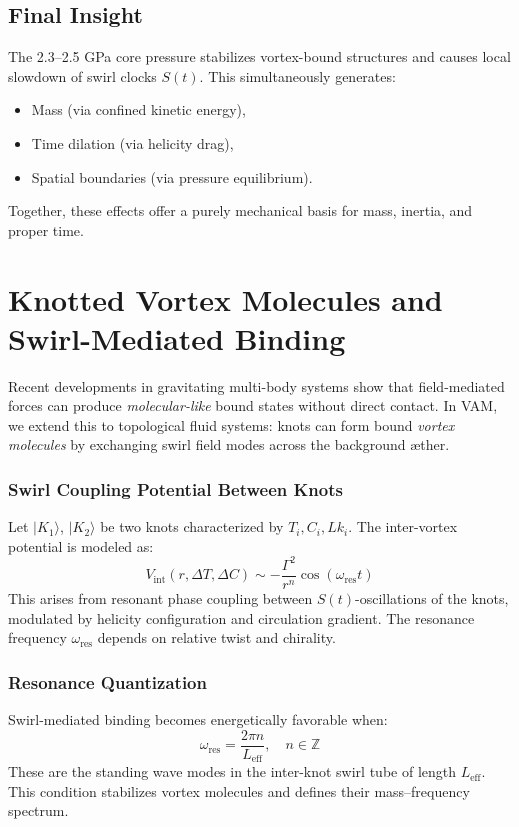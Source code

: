 \subsection*{Final Insight}

The 2.3–2.5 GPa core pressure stabilizes vortex-bound structures and causes local slowdown of swirl clocks \( S(t) \). This simultaneously generates:
\begin{itemize}
  \item Mass (via confined kinetic energy),
  \item Time dilation (via helicity drag),
  \item Spatial boundaries (via pressure equilibrium).
\end{itemize}
Together, these effects offer a purely mechanical basis for mass, inertia, and proper time.

\section{Knotted Vortex Molecules and Swirl-Mediated Binding}

Recent developments in gravitating multi-body systems show that field-mediated forces can produce \emph{molecular-like} bound states without direct contact. In VAM, we extend this to topological fluid systems: knots can form bound \textit{vortex molecules} by exchanging swirl field modes across the background æther.

\subsubsection*{Swirl Coupling Potential Between Knots}

Let \( |K_1\rangle \), \( |K_2\rangle \) be two knots characterized by \( T_i, C_i, Lk_i \). The inter-vortex potential is modeled as:
\[
V_{\text{int}}(r, \Delta T, \Delta C) \sim -\frac{\Gamma^2}{r^n} \cos(\omega_{\text{res}} t)
\]
This arises from resonant phase coupling between \( S(t) \)-oscillations of the knots, modulated by helicity configuration and circulation gradient. The resonance frequency \( \omega_{\text{res}} \) depends on relative twist and chirality.

\subsubsection*{Resonance Quantization}

Swirl-mediated binding becomes energetically favorable when:
\[
\omega_{\text{res}} = \frac{2\pi n}{L_{\text{eff}}}, \quad n \in \mathbb{Z}
\]
These are the standing wave modes in the inter-knot swirl tube of length \( L_{\text{eff}} \). This condition stabilizes vortex molecules and defines their mass–frequency spectrum.

